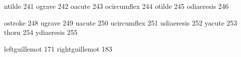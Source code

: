  ntilde            241
 ograve            242
 oacute            243
 ocircumflex       244
 otilde            245
 odiaeresis        246

 ostroke           248
 ugrave            249
 uacute            250
 ucircumflex       251
 udiaeresis        252
 yacute            253
 thorn             254
 ydiaeresis        255

 leftguillemot     171
 rightguillemot    183      

\stopencoding

\endinput 
